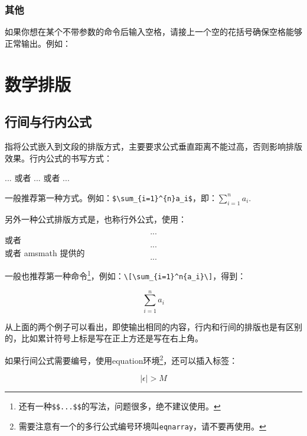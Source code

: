 {\subsection{其他}
如果你想在某个不带参数的命令后输入空格，请接上一个空的花括号确保空格能够正常输出。例如：

\chapter{数学排版}
\section{行间与行内公式}
指将公式嵌入到文段的排版方式，主要要求公式垂直距离不能过高，否则影响排版效果。行内公式的书写方式：
\begin{latex}{}
$...$ 或者 \(...\) 或者 \begin{math}...\end{math}
\end{latex}

一般推荐第一种方式。例如：\verb|$\sum_{i=1}^{n}a_i$|，即：$\sum_{i=1}^{n}a_i$. 

另外一种公式排版方式是，也称行外公式，使用：
\begin{latex}{}
\[...\] 或者 \begin{displaymath}...\end{displaymath}
或者 amsmath 提供的\begin{equation*}...\end{equation*}
\end{latex}

一般也推荐第一种命令\footnote{还有一种\texttt{\$\$...\$\$}的写法，问题很多，绝不建议使用。}，例如：\verb|\[\sum_{i=1}^n{a_i}\]|，得到：

\[\sum_{i=1}^{n}a_i\]

从上面的两个例子可以看出，即使输出相同的内容，行内和行间的排版也是有区别的，比如累计符号上标是写在正上方还是写在右上角。

如果行间公式需要编号，使用equation环境\footnote{需要注意有一个的多行公式编号环境叫\texttt{eqnarray}，请不要再使用。}，还可以插入标签：

\begin{codeshow}
\begin{equation}
\label{eq:NoExample}
  |\epsilon|>M
\end{equation}
\end{codeshow}

}
